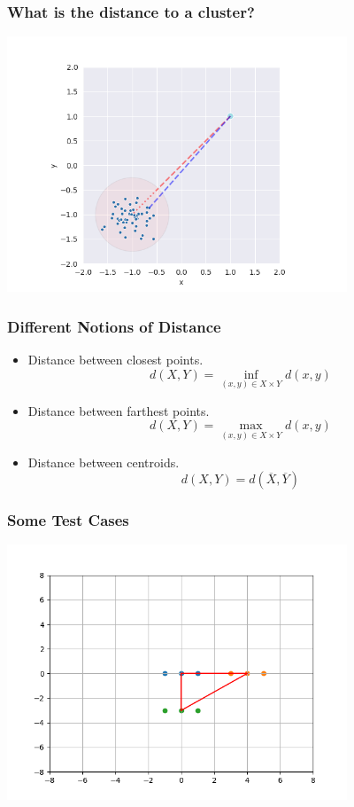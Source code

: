 \documentclass[colorlinks=true,linkcolor=blue]{beamer}
\begin{document}
\begin{frame}
  \frametitle{What is the distance to a cluster?}
  \includegraphics[width=4in]{../png/cluster_distance.png}
\end{frame}
\begin{frame}
  \frametitle{Different Notions of Distance}
  \begin{itemize}
  \item<1-> Distance between closest points.
    $$
    d(X,Y)=\inf_{(x,y)\in X\times Y} d(x,y)
    $$
    
  \item<2-> Distance between farthest points.
    $$
    d(X,Y)=\max_{(x,y)\in X\times Y} d(x,y)
    $$
  \item<3-> Distance between centroids.
    $$
    d(X,Y)=d(\overline{X},\overline{Y})
    $$
  \end{itemize}
\end{frame}
\begin{frame}
  \frametitle{Some Test Cases}
  \begin{center}
    \includegraphics[width=4in]{../png/centroid.png}
  \end{center}
\end{frame}
\end{document}
